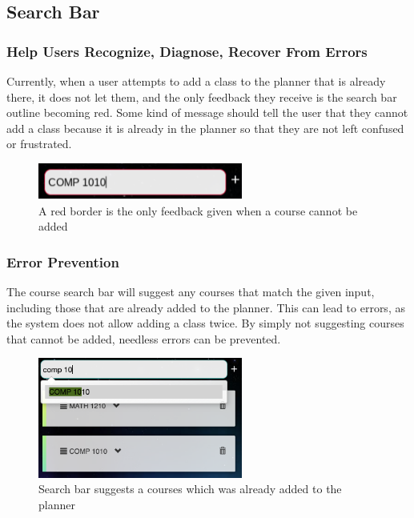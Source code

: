 \documentclass{article}
\begin{document}
\subsection{Search Bar}


\subsubsection{Help Users Recognize, Diagnose, Recover From Errors}
Currently, when a user attempts to add a class to the planner that is already there, it does not let them, and the only feedback they receive is the search bar outline becoming red. Some kind of message should tell the user that they cannot add a class because it is already in the planner so that they are not left confused or frustrated.

\begin{figure}[h!]
    \centering
    \includegraphics[width = 0.6\textwidth]{AddClassesError.png}
    
    \caption{A red border is the only feedback given when a course cannot be added}
    \label{fig:addClassError}
\end{figure}


\subsubsection{Error Prevention}
The course search bar will suggest any courses that match the given input, including those that are already added to the planner. This can lead to errors, as the system does not allow adding a class twice. By simply not suggesting courses that cannot be added, needless errors can be prevented.


\begin{figure}[h!]
    \centering
    \includegraphics[width=0.6\textwidth,]{duplicateCourse.png}

    \caption{Search bar suggests a courses which was already added to the planner}
    \label{fig:duplicateCourse}
\end{figure}
\end{document}
